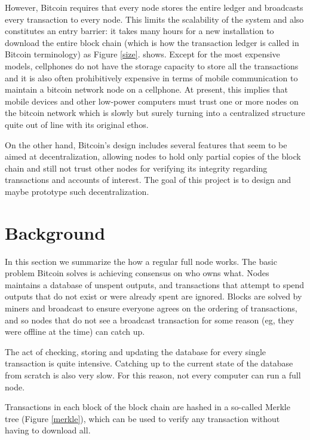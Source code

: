 \documentclass[a4paper,12pt]{article}
\begin{document}
However, Bitcoin requires that every node stores the entire ledger and broadcasts every transaction to every node. This limits the scalability of the system and also constitutes an entry barrier: it takes many hours for a new installation to download the entire block chain (which is how the transaction ledger is called in Bitcoin terminology) as Figure \ref{size}. shows. Except for the most expensive models, cellphones do not have the storage capacity to store all the transactions and it is also often prohibitively expensive in terms of mobile communication to maintain a bitcoin network node on a cellphone. At present, this implies that mobile devices and other low-power computers must trust one or more nodes on the bitcoin network which is slowly but surely turning into a centralized structure quite out of line with its original ethos.

On the other hand, Bitcoin's design includes several features that seem to be aimed at decentralization, allowing nodes to hold only partial copies of the block chain and still not trust other nodes for verifying its integrity regarding transactions and accounts of interest. The goal of this project is to design and maybe prototype such decentralization.

\section{Background}

In this section we summarize the how a regular full node works. The basic problem Bitcoin solves is achieving consensus on who owns what. Nodes maintains a database of unspent outputs, and transactions that attempt to spend outputs that do not exist or were already spent are ignored. Blocks are solved by miners and broadcast to ensure everyone agrees on the ordering of transactions, and so nodes that do not see a broadcast transaction for some reason (eg, they were offline at the time) can catch up.

The act of checking, storing and updating the database for every single transaction is quite intensive. Catching up to the current state of the database from scratch is also very slow. For this reason, not every computer can run a full node.

Transactions in each block of the block chain are hashed in a so-called Merkle tree (Figure \ref{merkle}), which can be used to verify any transaction without having to download all. 
\end{document}
